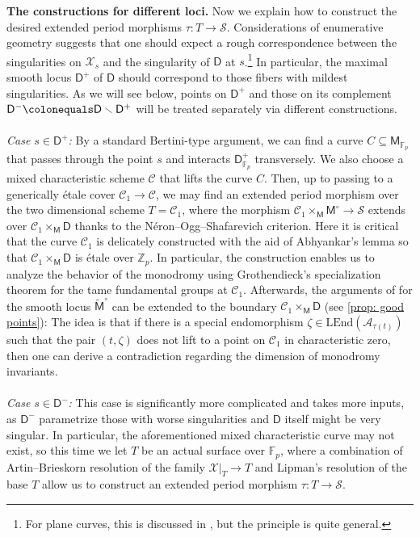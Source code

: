 \documentclass[11pt, letterpaper]{amsart}
\theoremstyle{plain}
\theoremstyle{definition}
\newcommand{\IF}{\mathbb{F}}
\newcommand{\IZ}{\mathbb{Z}}
\newcommand{\sC}{\mathcal{C}}
\newcommand{\<}{\langle}
\renewcommand{\>}{\rangle}
\def\wt{\widetilde}
\newcommand{\shS}{\mathscr{S}}
\newcommand{\sfD}{\mathsf{D}}
\newcommand{\sfM}{\mathsf{M}}
\newcommand{\sA}{\mathcal{A}}
\newcommand{\sX}{\mathcal{X}}
\newcommand{\LEnd}{\mathrm{LEnd}}
\begin{document}
\textbf{The constructions for different loci.}
Now we explain how to construct the desired extended period morphisms $\tau : T \to \shS$. 
Considerations of enumerative geometry suggests that one should expect a rough correspondence between the singularities on $\sX_s$ and the singularity of $\sfD$ at $s$.\footnote{For plane curves, this is discussed in \cite[\S7.7.2]{3264}, but the principle is quite general.} 
In particular, the maximal smooth locus $\sfD^+$ of $\sfD$ should correspond to those fibers with mildest singularities. 
As we will see below, points on $\sfD^+$ and those on its complement $\sfD^-  \colonequals \sfD \smallsetminus \sfD^+$ will be treated separately via different constructions.\\\\
\textit{Case $s \in \sfD^+$:} By a standard Bertini-type argument, we can find a curve $C \subseteq \sfM_{\IF_p}$ that passes through the point $s$ and interacts $\sfD^+_{\IF_p}$ transversely.
We also choose a mixed characteristic scheme $\sC$ that lifts the curve $C$.
Then, up to passing to a generically \'etale cover $\sC_1 \to \sC$, we may find an extended period morphism over the two dimensional scheme $T = \sC_1$, where
the morphism $\sC_1 \times_\sfM \sfM^\circ \to \shS$ extends over $\sC_1 \times_\sfM \sfD$ thanks to the N\'eron--Ogg--Shafarevich criterion.
Here it is critical that the curve $\sC_1$ is delicately constructed with the aid of Abhyankar's lemma so that $\sC_1 \times_\sfM \sfD$ is \'etale over $\IZ_p$. 
In particular, the construction enables us to analyze the behavior of the monodromy using Grothendieck's specialization theorem for the tame fundamental groups at $\sC_1$.
Afterwards, the arguments of \cite{HYZ} for the smooth locus $\wt{\sfM}^\circ$ can be extended to the boundary $\sC_1 \times_\sfM \sfD$ (see \cref{prop: good points}):
The idea is that if there is a special endomorphism $\zeta \in \LEnd(\sA_{\tau(t)})$ such that the pair $(t, \zeta)$ does not lift to a point on $\sC_1$ in characteristic zero, then one can derive a contradiction regarding the dimension of monodromy invariants. \\\\
\textit{Case $s \in \sfD^-$:} This case is significantly more complicated and takes more inputs, as $\sfD^-$ parametrize those with worse singularities and $\sfD$ itself might be very singular.
In particular, the aforementioned mixed characteristic curve may not exist, so this time we let $T$ be an actual surface over $\IF_p$, where a combination of Artin--Brieskorn resolution of the family $\sX|_T\to T$ and Lipman's resolution of the base $T$ allow us to construct an extended period morphism $\tau:T\to \shS$.
\end{document}
